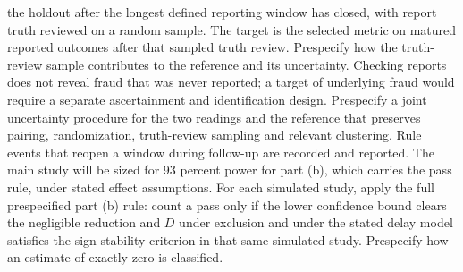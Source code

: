 \documentclass[
  11pt,
]{article}
\begin{document}
the holdout after the longest defined reporting window has closed, with
report truth reviewed on a random sample. The target is the selected
metric on matured reported outcomes after that sampled truth review.
Prespecify how the truth-review sample contributes to the reference and
its uncertainty. Checking reports does not reveal fraud that was never
reported; a target of underlying fraud would require a separate
ascertainment and identification design. Prespecify a joint uncertainty
procedure for the two readings and the reference that preserves pairing,
randomization, truth-review sampling and relevant clustering. Rule
events that reopen a window during follow-up are recorded and reported.
The main study will be sized for 93 percent power for part (b), which
carries the pass rule, under stated effect assumptions. For each
simulated study, apply the full prespecified part (b) rule: count a pass
only if the lower confidence bound clears the negligible reduction and
\(D\) under exclusion and under the stated delay model satisfies the
sign-stability criterion in that same simulated study. Prespecify how an
estimate of exactly zero is classified.
\end{document}
